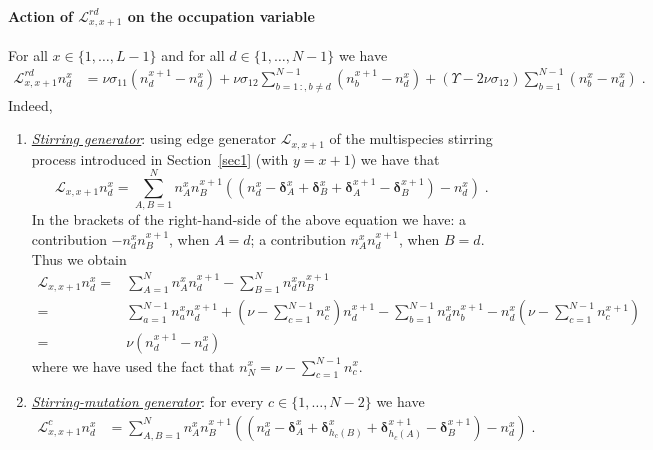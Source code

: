 \documentclass[10pt]{article}
\numberwithin{equation}{section}
\numberwithin{equation}{subsection}
\newcommand{\dt}{\;.}
\begin{document}
\paragraph{Action of $\mathcal{L}_{x,x+1}^{rd}$ on the occupation variable}
For all $x\in \{1,\ldots,L-1\}$ and for all $d\in \{1,\ldots,N-1\}$ we have
\begin{equation}\label{actionGraphRD}
	\begin{split}
		\mathcal{L}_{x,x+1}^{rd}n_{d}^{x}&=\nu \sigma_{11}(n_{d}^{x+1}-n_{d}^{x})+\nu\sigma_{12}\sum_{b=1\,:	,b\neq d}^{N-1}(n_{b}^{x+1}-n_{d}^{x})+(\Upsilon-2\nu\sigma_{12})\sum_{b=1}^{N-1}(n_{b}^{x}-n_{d}^{x})\dt
	\end{split}
\end{equation}
Indeed, 
\begin{enumerate}
	\item \textit{\underline{Stirring generator}}: {using edge generator $\mathcal{L}_{x,x+1}$ of the multispecies stirring process introduced in Section~\ref{sec1} (with $y=x+1$) we have that} 
\begin{equation}
	\mathcal{L}_{x,x+1}n_{d}^{x}=\sum_{A,B=1}^{N}n_{A}^{x}n_{B}^{x+1}\left((n_{d}^{x}-\bm{\delta}_{A}^{x}+\bm{\delta}_{B}^{x}+\bm{\delta}_{A}^{x+1}-\bm{\delta}_{B}^{x+1})-n_{d}^{x}\right)\dt
\end{equation}
In the brackets of the right-hand-side of the above equation we have: a contribution $-n_{d}^{x}n_{B}^{x+1}$, when $A=d$; a contribution $n_{A}^{x}n_{d}^{x+1}$, when $B=d$. Thus we obtain 
\begin{align*}
	\mathcal{L}_{x,x+1}n_{d}^{x}=&\sum_{A=1}^{N}n_{A}^{x}n_{d}^{x+1}-\sum_{B=1}^{N}n_{d}^{x}n_{B}^{x+1}\\
	=&\sum_{a=1}^{N-1}n_{a}^{x}n_{d}^{x+1}+(\nu-\sum_{c=1}^{N-1}n_{c}^{x})n_{d}^{x+1}-\sum_{b=1}^{N-1}n_{d}^{x}n_{b}^{x+1}-n_{d}^{x}(\nu-\sum_{c=1}^{N-1}n_{c}^{x+1})\\
	=&\nu\left(n_{d}^{x+1}-n_{d}^{x}\right)
\end{align*} 
where we have used the fact that $n_{N}^{x}=\nu-\sum_{c=1}^{N-1}n_{c}^{x}$.
\item \textit{\underline{Stirring-mutation generator}}: for every $c\in \{1,\ldots,N-2\}$ we have 
\begin{equation}
	\begin{split}
		\mathcal{L}_{x,x+1}^{c}n_{d}^{x}&=\sum_{A,B=1}^{N}n_{A}^{x}n_{B}^{x+1}\left((n_{d}^{x}-\bm{\delta}_{A}^{x}+\bm{\delta}_{h_{c}(B)}^{x}+\bm{\delta}_{h_{c}(A)}^{x+1}-\bm{\delta}_{B}^{x+1})-n_{d}^{x}\right)\dt
	\end{split}

\end{equation}
\end{enumerate}
\end{document}
